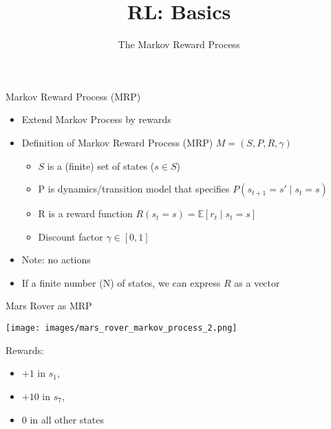 \documentclass[aspectratio=169]{../latex_main/tntbeamer}  %
\title[Reinforcement Learning: Basics]{RL: Basics}
\subtitle{The Markov Reward Process}
\begin{document}
	
	\maketitle

\begin{frame}[c]{Markov Reward Process (MRP)}

\begin{itemize}
	\item Extend Markov Process by rewards
	\item Definition of Markov Reward Process (MRP) $M =(S, P, R, \gamma)$
	\begin{itemize}
		\item $S$ is a (finite) set of states ($s \in S$)
		\item P is dynamics/transition model that specifies $P(s_{t+1}=s' \mid s_t = s)$
		\item R is a reward function $R(s_t = s) = \mathbb{E}[r_t \mid s_t = s]$
		\item Discount factor $\gamma \in [0,1]$
	\end{itemize}
	\item Note: no actions
	\item If a finite number (N) of states, we can express $R$ as a vector
\end{itemize}

\end{frame}
\begin{frame}[c]{Mars Rover as MRP}
	
\begin{center}
	\texttt{[image: images/mars\_rover\_markov\_process\_2.png]}
\end{center}

Rewards:
\begin{itemize}
	\item $+1$ in $s_1$, 
	\item $+10$ in $s_7$,
	\item $0$ in all other states
\end{itemize}
	
\end{frame}
\end{document}
